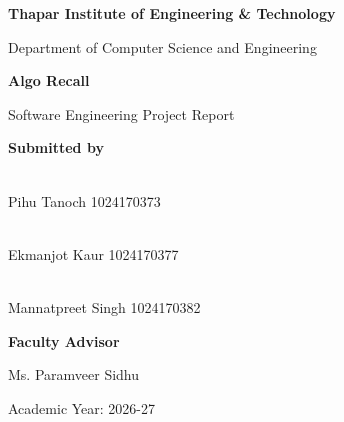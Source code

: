 \documentclass[12pt,a4paper]{report}
\newcommand{\UniversityName}{Thapar Institute of Engineering \& Technology}
\newcommand{\DepartmentName}{Department of Computer Science and Engineering}
\newcommand{\ProjectTitle}{Algo Recall}
\begin{document}
\begin{titlepage}
\centering
\vspace*{1cm}
{\Large\bfseries \UniversityName\par}
\vspace{0.5cm}
{\large \DepartmentName\par}
\vspace{2cm}
{\Huge\bfseries \ProjectTitle\par}
\vspace{0.5cm}
{\Large Software Engineering Project Report\par}
\vspace{2cm}
\textbf{Submitted by}\\[0.3cm]
{\large \\Pihu Tanoch  1024170373\par}
{\large \\Ekmanjot Kaur  1024170377\par}
{\large \\Mannatpreet Singh 1024170382\par}

\vspace{1.5cm}
\textbf{Faculty Advisor}\\[0.3cm]
{\large  Ms. Paramveer Sidhu\par}
\vfill
{\large Academic Year: 2026-27 \par}
\end{titlepage}
\end{document}
